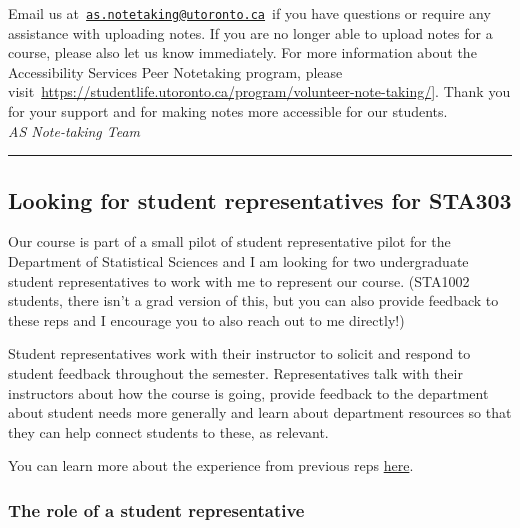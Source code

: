 \documentclass[
  openany]{book}
\begin{document}
Email us at~\href{mailto:as.notetaking@utoronto.ca}{\nolinkurl{as.notetaking@utoronto.ca}}~if you have questions or require any assistance with uploading notes. If you are no longer able to upload notes for a course, please also let us know immediately. For more information about the Accessibility Services Peer Notetaking program, please visit~\href{https://studentlife.utoronto.ca/program/volunteer-note-taking}{https://studentlife.utoronto.ca/program/volunteer-note-taking/}{]}. Thank you for your support and for making notes more accessible for our students.\\

\emph{AS Note-taking Team\\
}

\begin{center}\rule{0.5\linewidth}{0.5pt}\end{center}

\hypertarget{studentrep}{%
\subsection{Looking for student representatives for STA303}\label{studentrep}}

Our course is part of a small pilot of student representative pilot for the Department of Statistical Sciences and I am looking for two undergraduate student representatives to work with me to represent our course. (STA1002 students, there isn't a grad version of this, but you can also provide feedback to these reps and I encourage you to also reach out to me directly!)

Student representatives work with their instructor to solicit and respond to student feedback throughout the semester. Representatives talk with their instructors about how the course is going, provide feedback to the department about student needs more generally and learn about department resources so that they can help connect students to these, as relevant.

You can learn more about the experience from previous reps \href{https://www.statistics.utoronto.ca/news/new-pilot-program-enhances-academic-experience-giving-students-voice}{here}.

\hypertarget{the-role-of-a-student-representative}{%
\subsubsection{The role of a student representative}\label{the-role-of-a-student-representative}}
\end{document}
